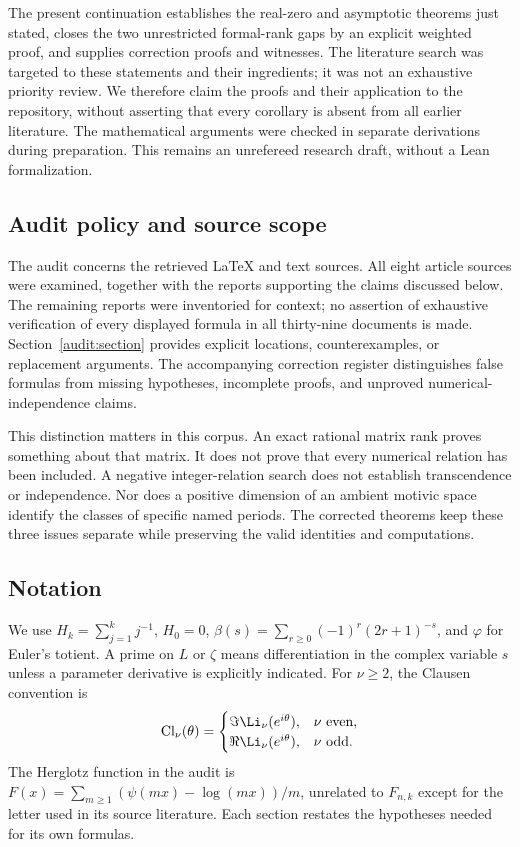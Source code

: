 The present continuation establishes the real-zero and asymptotic
theorems just stated, closes the two unrestricted formal-rank gaps by an
explicit weighted proof, and supplies correction proofs and witnesses.
The literature search was targeted to these statements and their
ingredients; it was not an exhaustive priority review.  We therefore
claim the proofs and their application to the repository, without
asserting that every corollary is absent from all earlier literature.
The mathematical arguments were checked in separate derivations during
preparation.  This remains an unrefereed research draft, without a Lean
formalization.

\subsection{Audit policy and source scope}

The audit concerns the retrieved \LaTeX{} and text sources.  All eight
article sources were examined, together with the reports supporting the
claims discussed below.  The remaining reports were inventoried for
context; no assertion of exhaustive verification of every displayed
formula in all thirty-nine documents is made.
Section~\ref{audit:section} provides explicit locations, counterexamples,
or replacement arguments.  The accompanying correction register
distinguishes false formulas from missing hypotheses, incomplete proofs,
and unproved numerical-independence claims.

This distinction matters in this corpus.  An exact rational matrix rank
proves something about that matrix.  It does not prove that every
numerical relation has been included.  A negative integer-relation
search does not establish transcendence or independence.  Nor does a
positive dimension of an ambient motivic space identify the classes of
specific named periods.  The corrected theorems keep these three issues
separate while preserving the valid identities and computations.

\subsection{Notation}

We use $H_k=\sum_{j=1}^k j^{-1}$, $H_0=0$,
$\beta(s)=\sum_{r\geq0}(-1)^r(2r+1)^{-s}$, and $\varphi$ for Euler's
totient.  A prime on $L$ or $\zeta$ means differentiation in the complex
variable $s$ unless a parameter derivative is explicitly indicated.
For $\nu\geq2$, the Clausen convention is
\[
 \operatorname{Cl}_\nu(\theta)=
 \begin{cases}
  \Im\Li_\nu(e^{i\theta}),&\nu\ \text{even},\\
  \Re\Li_\nu(e^{i\theta}),&\nu\ \text{odd}.
 \end{cases}
\]
The Herglotz function in the audit is
$F(x)=\sum_{m\geq1}(\psi(mx)-\log(mx))/m$, unrelated to
$F_{n,k}$ except for the letter used in its source literature.
Each section restates the hypotheses needed for its own formulas.
